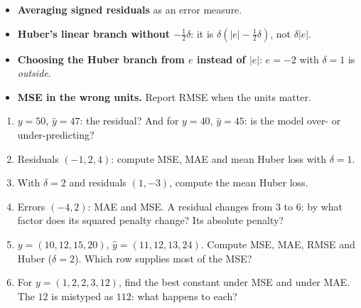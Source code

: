 \documentclass[11pt]{article}
\begin{document}
\begin{caution}
\begin{itemize}
  \item \textbf{Averaging signed residuals} as an error measure.
  \item \textbf{Huber's linear branch without $-\tfrac12\delta$}: it is
    $\delta(|e| - \tfrac12\delta)$, not $\delta|e|$.
  \item \textbf{Choosing the Huber branch from $e$ instead of $|e|$}: $e = -2$
    with $\delta = 1$ is \emph{outside}.
  \item \textbf{MSE in the wrong units.} Report RMSE when the units matter.
\end{itemize}
\end{caution}

\begin{tryit}
\begin{enumerate}[label=\textbf{E2.\arabic*}]
  \item $y = 50$, $\hat y = 47$: the residual? And for $y = 40$, $\hat y = 45$:
    is the model over- or under-predicting?
  \item Residuals $(-1, 2, 4)$: compute MSE, MAE and mean Huber loss with
    $\delta = 1$.
  \item With $\delta = 2$ and residuals $(1, -3)$, compute the mean Huber loss.
  \item Errors $(-4, 2)$: MAE and MSE. A residual changes from $3$ to $6$: by
    what factor does its squared penalty change? Its absolute penalty?
  \item $y = (10, 12, 15, 20)$, $\hat y = (11, 12, 13, 24)$. Compute MSE, MAE,
    RMSE and Huber ($\delta = 2$). Which row supplies most of the MSE?
  \item For $y = (1, 2, 2, 3, 12)$, find the best constant under MSE and under
    MAE. The $12$ is mistyped as $112$: what happens to each?
\end{enumerate}
\end{tryit}
\end{document}
